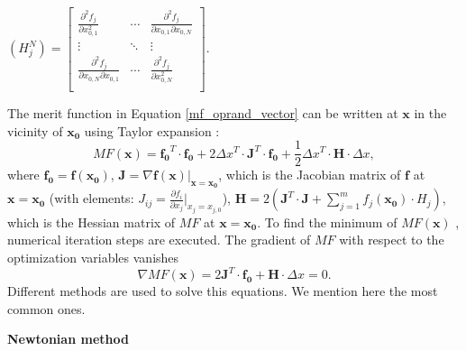 \medskip
\begin{center}
$
\left( H^N_{j} \right) = 
\begin{bmatrix}
\frac{\partial^2 f_j}{\partial{x_{0,1}^2}} &    \cdots          & \frac{\partial^2 f_j}{\partial{x_{0,1}\partial{x_{0,N}}}}    \\
       \vdots                   &     \ddots            & \vdots \\
\frac{\partial^2 f_j}{\partial{x_{0,N}\partial{x_{0,1}}}}     & \cdots           & \frac{\partial^2 f_j}{\partial{x_{0,N}^2}} \\
\end{bmatrix}
$.
\end{center}
\medskip
The merit function in Equation \ref{mf_oprand_vector} can be written at $\pmb{x}$ in the vicinity of $\pmb{x_0}$ using Taylor expansion :
\begin{equation} \label{mf_expanded}
MF(\pmb{x}) = \pmb{f_{0}}^{T} \cdot \pmb{f_{0}} + 2 \Delta x^{T} \cdot \pmb{J}^{T} \cdot \pmb{f_{0}} + \frac{1}{2} \Delta x^{T} \cdot \pmb{H} \cdot \Delta x,
\end{equation}where $\pmb{f_0} = \pmb{f}(\pmb{x_0})$, $\pmb{J} = \nabla \pmb{f}(\pmb{x})\vert _{\pmb{x} = \pmb{x_0}}$, which is the Jacobian matrix of $\pmb{f}$ at $ \pmb{x} = \pmb{x_0} $ (with elements: $J_{ij} = \frac{\partial{f_i}}{\partial {x_j}} \vert _{x_j = x_{j,0}}$), $\pmb{H} = 2 \left( \pmb{J}^T \cdot \pmb{J} + \sum_{j=1}^{m} f_j(\pmb{x_0}) \cdot H_j \right) $, which is the Hessian matrix of $MF$ at $ \pmb{x} = \pmb{x_0} $. 
To find the minimum of $MF(\pmb{x})$ , numerical iteration steps are executed. The gradient of $MF$ with respect to the optimization variables vanishes
\begin{equation}\label{eq: MF_grad_zero}
\nabla MF(\pmb{x}) = 2 \pmb{J}^{T} \cdot \pmb{f_0} + \pmb{H} \cdot \Delta x = 0.
\end{equation}Different methods are used to solve this equations. We mention here the most common ones. 
\newline

\textbf{Newtonian method}

